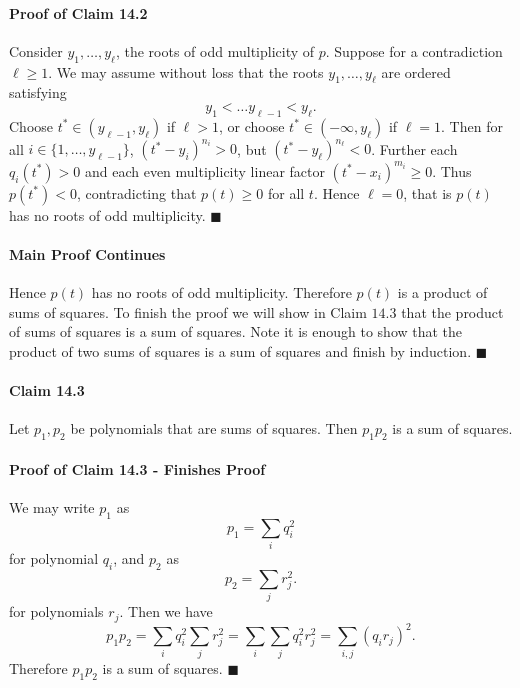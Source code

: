 \documentclass[letterpaper,12pt,oneside,onecolumn]{article}
\newcommand{\1}{\mathbbm{1}}
\begin{document}
\paragraph{Proof of Claim 14.2}
Consider $y_1, \dots, y_\ell$, the roots of odd multiplicity of $p$. Suppose for a contradiction $\ell \geq 1$. We may assume without loss that the roots $y_1, \dots, y_\ell$ are ordered satisfying
$$y_1 < \dots y_{\ell -1}< y_\ell.$$
Choose $t^* \in (y_{\ell-1}, y_\ell)$ if $\ell >1$, or choose $t^* \in (-\infty, y_\ell)$ if $\ell = 1$. Then for all $i \in \{1, \dots, y_{\ell - 1}\}$, $(t^* - y_i)^{n_i} > 0$, but $(t^* - y_\ell)^{n_\ell} < 0$. Further each $q_i(t^*) > 0$ and each even multiplicity linear factor $(t^* - x_i)^{m_i} \geq 0$. Thus $p(t^*) < 0$, contradicting that $p(t) \geq 0$ for all $t$. Hence $\ell = 0$, that is $p(t)$ has no roots of odd multiplicity. $\blacksquare$
\paragraph{Main Proof Continues}
Hence $p(t)$ has no roots of odd multiplicity. Therefore $p(t)$ is a product of sums of squares. To finish the proof we will show in Claim $14.3$ that the product of sums of squares is a sum of squares. Note it is enough to show that the product of two sums of squares is a sum of squares and finish by induction. $\blacksquare$
\paragraph{Claim 14.3}
Let $p_1,p_2$ be polynomials that are sums of squares. Then $p_1p_2$ is a sum of squares.
\paragraph{Proof of Claim 14.3 - Finishes Proof}
We may write $p_1$ as
$$p_1 = \sum_i q_i^2$$
for polynomial $q_i$, and $p_2$ as 
$$p_2 = \sum_j r_j^2.$$
for polynomials $r_j$. Then we have
$$p_1p_2 = \sum_i q_i^2 \sum_j r_j^2 = \sum_i\sum_j q_i^2r_j^2 = \sum_{i,j} (q_ir_j)^2.$$
Therefore $p_1p_2$ is a sum of squares. $\blacksquare$
\end{document}
